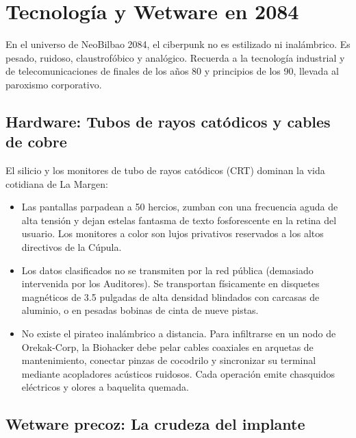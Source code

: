 \chapter{Tecnología y Wetware en 2084}

En el universo de NeoBilbao 2084, el ciberpunk no es estilizado ni inalámbrico. Es pesado, ruidoso, claustrofóbico y analógico. Recuerda a la tecnología industrial y de telecomunicaciones de finales de los años 80 y principios de los 90, llevada al paroxismo corporativo.

\section{Hardware: Tubos de rayos catódicos y cables de cobre}


El silicio y los monitores de tubo de rayos catódicos (CRT) dominan la vida cotidiana de La Margen:

\begin{itemize}
  \item {} Las pantallas parpadean a 50 hercios, zumban con una frecuencia aguda de alta tensión y dejan estelas fantasma de texto fosforescente en la retina del usuario. Los monitores a color son lujos privativos reservados a los altos directivos de la Cúpula.
  \item {} Los datos clasificados no se transmiten por la red pública (demasiado intervenida por los Auditores). Se transportan físicamente en disquetes magnéticos de 3.5 pulgadas de alta densidad blindados con carcasas de aluminio, o en pesadas bobinas de cinta de nueve pistas.
  \item {} No existe el pirateo inalámbrico a distancia. Para infiltrarse en un nodo de Orekak-Corp, la Biohacker debe pelar cables coaxiales en arquetas de mantenimiento, conectar pinzas de cocodrilo y sincronizar su terminal mediante acopladores acústicos ruidosos. Cada operación emite chasquidos eléctricos y olores a baquelita quemada.
\end{itemize}

\section{Wetware precoz: La crudeza del implante}

